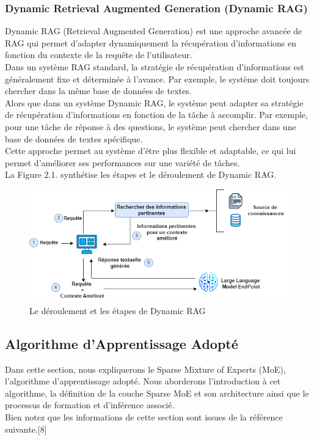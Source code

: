 \subsubsection{Dynamic Retrieval Augmented Generation (Dynamic RAG)}
\justifying
Dynamic RAG (Retrieval Augmented Generation) est une approche avancée de RAG qui permet d'adapter dynamiquement la récupération d'informations en fonction du contexte de la requête de l'utilisateur.\\
Dans un système RAG standard, la stratégie de récupération d'informations est généralement fixe et déterminée à l'avance. Par exemple, le système doit toujours chercher dans la même base de données de textes.\\
Alors que dans un système Dynamic RAG, le système peut adapter sa stratégie de récupération d'informations en fonction de la tâche à accomplir. Par exemple, pour une tâche de réponse à des questions, le système peut chercher dans une base de données de textes spécifique.\\
Cette approche permet au système d'être plus flexible et adaptable, ce qui lui permet d’améliorer ses performances sur une variété de tâches.\\
La Figure 2.1. synthétise les étapes et le déroulement  de Dynamic RAG.

\begin{figure}[H]
    \centering
    \includegraphics[width=\textwidth]{images/chp2/fig1.png}
   \caption{Le déroulement et les étapes de Dynamic RAG}
    \label{fig:deroulement dynamic rag}      
\end{figure}


\subsection{Algorithme d’Apprentissage Adopté}
\justifying
Dans cette section, nous expliquerons le Sparse Mixture of Experts (MoE), l’algorithme d’apprentissage adopté. Nous aborderons l'introduction à cet algorithme, la définition de la couche Sparse MoE et son architecture ainsi que le processus de formation et d'inférence associé.\\
Bien notez que les informations de cette section sont issues de la référence suivante.[8]


